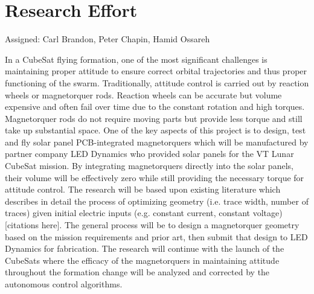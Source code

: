 \section{Research Effort}
Assigned: Carl Brandon, Peter Chapin, Hamid Ossareh

In a CubeSat flying formation, one of the most significant challenges
is maintaining proper attitude to ensure correct orbital trajectories
and thus proper functioning of the swarm. Traditionally, attitude
control is carried out by reaction wheels or magnetorquer
rods. Reaction wheels can be accurate but volume expensive and often
fail over time due to the constant rotation and high
torques. Magnetorquer rods do not require moving parts but provide
less torque and still take up substantial space. One of the key
aspects of this project is to design, test and fly solar panel
PCB-integrated magnetorquers which will be manufactured by partner
company LED Dynamics who provided solar panels for the VT Lunar
CubeSat mission. By integrating magnetorquers directly into the solar
panels, their volume will be effectively zero while still providing
the necessary torque for attitude control. The research will be based
upon existing literature which describes in detail the process of
optimizing geometry (i.e. trace width, number of traces) given initial
electric inputs (e.g. constant current, constant voltage)[citations here]. The general process will be to design a magnetorquer geometry based on the mission requirements and prior art, then submit that design to LED Dynamics for fabrication. The research will continue with the launch of the CubeSats where the efficacy of the magnetorquers in maintaining attitude throughout the formation change will be analyzed and corrected by the autonomous control algorithms.
